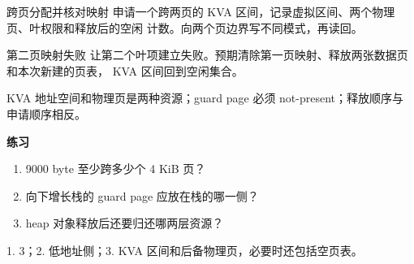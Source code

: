 
\begin{experimentbox}{跨页分配并核对映射}
申请一个跨两页的 KVA 区间，记录虚拟区间、两个物理页、叶权限和释放后的空闲
计数。向两个页边界写不同模式，再读回。
\end{experimentbox}

\begin{faultinjectionbox}{第二页映射失败}
让第二个叶项建立失败。预期清除第一页映射、释放两张数据页和本次新建的页表，
KVA 区间回到空闲集合。
\end{faultinjectionbox}

\begin{pitfallbox}
KVA 地址空间和物理页是两种资源；guard page 必须 not-present；释放顺序与
申请顺序相反。
\end{pitfallbox}

\textbf{练习}
\begin{enumerate}[leftmargin=2.2em]
  \item 9000 byte 至少跨多少个 4 KiB 页？
  \item 向下增长栈的 guard page 应放在栈的哪一侧？
  \item heap 对象释放后还要归还哪两层资源？
\end{enumerate}
\begin{answerbox}
1. 3；2. 低地址侧；3. KVA 区间和后备物理页，必要时还包括空页表。
\end{answerbox}
